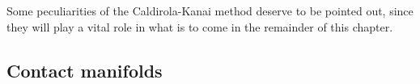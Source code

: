Some peculiarities of the Caldirola-Kanai method deserve to be pointed out, since they will play a vital role in what
is to come in the remainder of this chapter.

\subsection{Contact manifolds}


%
